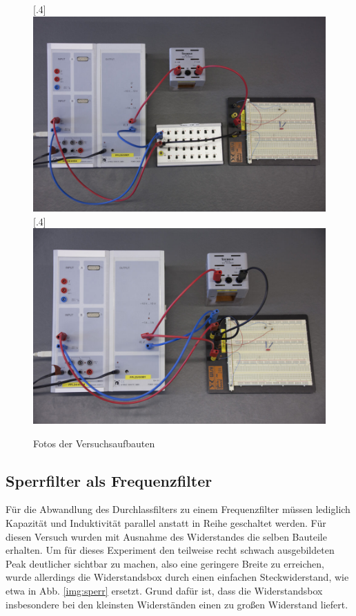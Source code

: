 \begin{figure}[h]
\centering
    [.4\linewidth]
            {\includegraphics[width=.4\textwidth]{images/durchlassfilter.jpg}}
    [.4\linewidth]
            {\includegraphics[width=.4\textwidth]{images/sperrfilter.jpg}}
\caption{Fotos der Versuchsaufbauten}
\end{figure}

\subsection{Sperrfilter als Frequenzfilter}
Für die Abwandlung des Durchlassfilters zu einem Frequenzfilter müssen lediglich Kapazität und Induktivität parallel anstatt in Reihe geschaltet werden. Für diesen Versuch wurden mit Ausnahme des Widerstandes die selben Bauteile erhalten. Um für dieses Experiment den teilweise recht schwach ausgebildeten Peak deutlicher sichtbar zu machen, also eine geringere Breite zu erreichen, wurde allerdings die Widerstandsbox durch einen einfachen Steckwiderstand, wie etwa in Abb. \ref{img:sperr}
ersetzt. Grund dafür ist, dass die Widerstandsbox insbesondere bei den kleinsten Widerständen einen zu großen Widerstand liefert.



